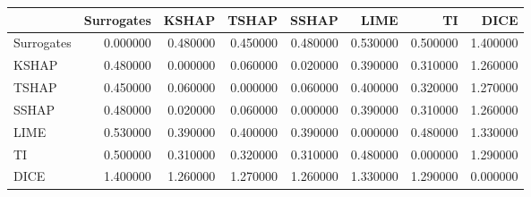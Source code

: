 \begin{tabular}{lrrrrrrr}
\toprule
 & Surrogates & KSHAP & TSHAP & SSHAP & LIME & TI & DICE \\
\midrule
Surrogates & 0.000000 & 0.480000 & 0.450000 & 0.480000 & 0.530000 & 0.500000 & 1.400000 \\
KSHAP & 0.480000 & 0.000000 & 0.060000 & 0.020000 & 0.390000 & 0.310000 & 1.260000 \\
TSHAP & 0.450000 & 0.060000 & 0.000000 & 0.060000 & 0.400000 & 0.320000 & 1.270000 \\
SSHAP & 0.480000 & 0.020000 & 0.060000 & 0.000000 & 0.390000 & 0.310000 & 1.260000 \\
LIME & 0.530000 & 0.390000 & 0.400000 & 0.390000 & 0.000000 & 0.480000 & 1.330000 \\
TI & 0.500000 & 0.310000 & 0.320000 & 0.310000 & 0.480000 & 0.000000 & 1.290000 \\
DICE & 1.400000 & 1.260000 & 1.270000 & 1.260000 & 1.330000 & 1.290000 & 0.000000 \\
\bottomrule
\end{tabular}
